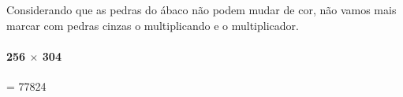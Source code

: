 \documentclass[12pt]{book}
\begin{document}
Considerando que as pedras do ábaco não
podem mudar de cor, não vamos mais marcar
com pedras cinzas o multiplicando e o
multiplicador.\\ 

\vspace{0.3cm}
\paragraph{256 $\times$ 304}= 77824\\

\vspace{0.2cm}
\begin{minipage}{0.5\textwidth}
\end{minipage}%
%
\begin{minipage}{0.4\textwidth}
\end{minipage}
\end{document}
